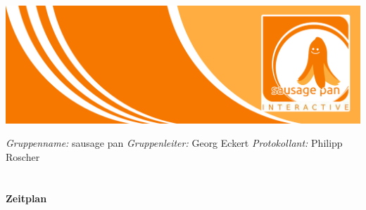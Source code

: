\documentclass[10pt,a4paper,notitlepage]{report}
\author{Sausage Pan}
\begin{document}
	\newcommand{\Eins}[1]{\color{orange}\textbf{{\Large#1}}} %
	\newcommand{\Zwei}[1]{\color{orange}\textbf{{\large#1}}} %
	\newcommand{\Drei}[1]{\color{orange}{\normalsize#1}} %
	\newcommand{\Text}{\color{schwarz}} %
	\newcommand{\Fusszeile}
	{\textit{{\footnotesize Eckert, Georg - Roscher, Philipp - Krien, Alexandra - Sinakow, Sergej - Blasberg, Bettina - Groß, Stephanie Sara}}} %
	\marginpar{\vspace{3.0mm} \color{orange}\rule{0.8mm}{53.3mm} \\[3mm] \color{hellorange}\rule{0.8mm}{170mm}}
	\begin{center}
		\includegraphics[width=160mm]{header2}
	\end{center}
	\color{orange} \textit{Gruppenname:} \color{schwarz}sausage pan \color{orange} \textit{Gruppenleiter:} \color{schwarz}Georg Eckert   \color{orange} \textit{Protokollant:} \color{schwarz}Philipp Roscher\\
	\\
	\\
	\Eins{Zeitplan}\
	\\\\
	\Text
\end{document}
